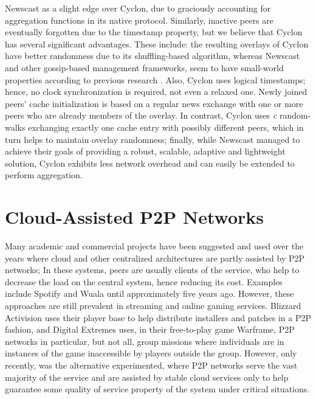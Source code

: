 \documentclass[runningheads]{llncs}
\begin{document}
Newscast as a slight edge over Cyclon, due to graciously accounting for aggregation functions in its native protocol. Similarly, inactive peers are eventually forgotten due to the timestamp property, but we believe that Cyclon has several significant advantages. These include: the resulting overlays of Cyclon have better randomness due to its shuffling-based algorithm, whereas Newscast and other gossip-based management frameworks, seem to have small-world properties according to previous research \cite{eval-gossip-based}. Also, Cyclon uses logical timestamps; hence, no clock synchronization is required, not even a relaxed one. Newly joined peers' cache initialization is based on a regular news exchange with one or more peers who are already members of the overlay. In contrast, Cyclon uses \textit{c} random-walks exchanging exactly one cache entry with possibly different peers, which in turn helps to maintain overlay randomness; finally, while Newscast managed to achieve their goals of providing a robust, scalable, adaptive and lightweight solution, Cyclon exhibits less network overhead and can easily be extended to perform aggregation.

\section{Cloud-Assisted P2P Networks}\label{sec:ca-networks}

Many academic and commercial projects have been suggested and used over the years where cloud and other centralized architectures are partly assisted by P2P networks; In these systems, peers are usually clients of the service, who help to decrease the load on the central system, hence reducing its cost. Examples include Spotify and Wuala until approximately five years ago. However, these approaches are still prevalent in streaming and online gaming services. Blizzard Activision uses their player base to help distribute installers and patches in a P2P fashion, and Digital Extremes uses, in their free-to-play game Warframe, P2P networks in particular, but not all, group missions where individuals are in instances of the game inaccessible by players outside the group. However, only recently, was the alternative experimented, where P2P networks serve the vast majority of the service and are assisted by stable cloud services only to help guarantee some quality of service property of the system under critical situations.
\end{document}
